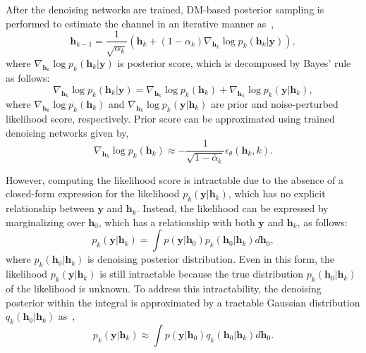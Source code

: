 \documentclass[lettersize,journal]{IEEEtran}
\begin{document}
After the denoising networks are trained, DM-based posterior sampling is performed to estimate the channel in an iterative manner as~\cite{zhouGenerativeDiffusionModels2025},
\begin{equation}
\label{eq:posterior_sampling}
\mathbf{h}_{k-1} = \frac{1}{\sqrt{ \alpha_{k} }}(\mathbf{h}_{k}+(1-\alpha_{k})\nabla_{\mathbf{h}_{k}}\log p_{k}(\mathbf{h}_{k}|\mathbf{y})),
\end{equation}
where $\nabla_{\mathbf{h}_{k}}\log p_{k}(\mathbf{h}_{k}|\mathbf{y})$ is posterior score, which is decomposed by Bayes' rule as follows:
\begin{equation}
\label{eq:posterior_score}
\nabla_{\mathbf{h}_{k}}\log p_{k}(\mathbf{h}_{k}|\mathbf{y}) = \nabla_{\mathbf{h}_{k}}\log p_{k}(\mathbf{h}_{k})+\nabla_{\mathbf{h}_{k}}\log p_{k}(\mathbf{y}|\mathbf{h}_{k}),
\end{equation}
where $\nabla_{\mathbf{h}_{k}}\log p_{k}(\mathbf{h}_{k})$ and $\nabla_{\mathbf{h}_{k}}\log p_{k}(\mathbf{y}|\mathbf{h}_{k})$ are prior and noise-perturbed likelihood score, respectively.
Prior score can be approximated using trained denoising networks given by,
\begin{equation}
\label{eq:prior_score}
\nabla_{\mathbf{h}_{k}}\log p_{k}(\mathbf{h}_{k})\approx -\frac{1}{\sqrt{ 1-\bar{\alpha}_{k} }}\epsilon_{\theta}(\mathbf{h}_{k},k).
\end{equation}

However, computing the likelihood score is intractable due to the absence of a closed-form expression for the likelihood $p_{k}(\mathbf{y}|\mathbf{h}_{k})$, which has no explicit relationship between $\mathbf{y}$ and $\mathbf{h}_{k}$. Instead, the likelihood can be expressed by marginalizing over $\mathbf{h}_{0}$, which has a relationship with both $\mathbf{y}$ and $\mathbf{h}_{k}$, as follows:
\begin{equation}
p_{k}(\mathbf{y}|\mathbf{h}_{k}) = \int p(\mathbf{y}|\mathbf{h}_{0})p_{k}(\mathbf{h}_{0}|\mathbf{h}_{k})d\mathbf{h}_{0},
\end{equation}
where $p_{k}(\mathbf{h}_{0}|\mathbf{h}_{k})$ is denoising posterior distribution. Even in this form, the likelihood $p_{k}(\mathbf{y}|\mathbf{h}_{k})$ is still intractable because the true distribution $p_{k}(\mathbf{h}_{0}|\mathbf{h}_{k})$ of the likelihood is unknown. To address this intractability, the denoising posterior within the integral is approximated by a tractable Gaussian distribution $q_{k}(\mathbf{h}_{0}|\mathbf{h}_{k})$ as~\cite{arvinteMIMOChannelEstimation2023,zhouGenerativeDiffusionModels2025},
\begin{equation}
p_{k}(\mathbf{y}|\mathbf{h}_{k}) \approx \int p(\mathbf{y}|\mathbf{h}_{0})q_{k}(\mathbf{h}_{0}|\mathbf{h}_{k})d\mathbf{h}_{0}.
\end{equation}
\end{document}
